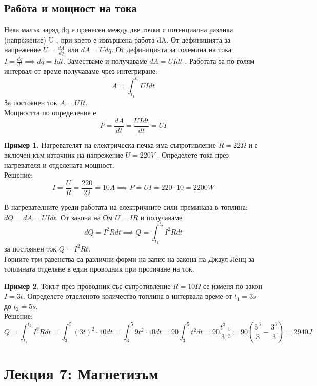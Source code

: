 \documentclass[fleqn, 12pt]{article}
\theoremstyle{definition}
\newtheorem{example}{Пример}[subsection]
\begin{document}
\subsection{Работа и мощност на тока}
Нека малък заряд dq е пренесен между две точки с потенциална разлика
(напрежение) U , при което е извършена работа dA. От дефиницията за
напрежение $U = \frac{dA}{dq}$ или $dA = Udq$. От дефиницията за големина на тока $I = \frac{dq}{dt} \implies dq = Idt$. Заместваме и получаваме $dA= U I dt$ . Работата за по-голям интервал от време
получаваме чрез интегриране:
$$A = \int_{t_1} ^{t_2} U I dt$$
За постоянен ток $A = UIt$. \\
Мощността по определение е
$$P = \frac{dA}{dt} = \frac{U I dt}{dt} = UI$$

\begin{example}
Нагревателят на електрическа печка има съпротивление $R = 22 \Omega$ и е
включен към източник на напрежение $U = 220 V$ . Определете тока през нагревателя
и отделената мощност.\\
Решение: 
$$I = \frac{U}{R} = \frac{220}{22} = 10A \implies P = UI = 220 \cdot 10 = 2200W$$
\end{example}

В нагревателните уреди работата на електричните сили преминава в топлина:
$dQ = dA = U I dt $. От закона на Ом $U = IR$ и получаваме
$$dQ = I^2 R dt \implies Q = \int_{t_1} ^{t_2} I^2 R dt$$
за постоянен ток $Q = I^2 R t$.\\
Горните три равенства са различни форми на запис на закона на Джаул-Ленц за
топлината отделяне в един проводник при протичане на ток.
 
\begin{example}
Токът през проводник със съпротивление $R = 10 \Omega$ се изменя по закон
$I = 3t$. Определете отделеното количество топлина в интервала време от $t_1 = 3s$  до
$t_2 = 5s$.\\
Решение: \\
$$Q = \int_{t_1} ^ {t_2} I^2 R dt =  \int_3 ^5 (3t)^2 \cdot 10 dt = \int_3 ^5 9t^2 \cdot 10 dt = 90 \int_3 ^5 t^2 dt = 90 \frac{t^3}{3} \Big| _3 ^ 5 = 90 \left( \frac{5^3}{3} - \frac{3^3}{3} \right) = 2940J$$

\end{example}


\newpage
\section{Лекция 7: Магнетизъм}
\end{document}
